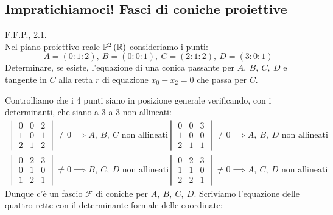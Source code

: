\subsection{Impratichiamoci! Fasci di coniche proiettive}
\begin{exercise} \textsc{F.F.P., 2.1.}\\
	Nel piano proiettivo reale $\proj[2]{\realset}$ consideriamo i punti:
	\begin{equation*}
		A=(0\colon 1 \colon 2),\ B=(0\colon 0\colon 1),\ C=(2\colon1\colon2),\ D=(3\colon0\colon1)
	\end{equation*}
	Determinare, se esiste, l'equazione di una conica passante per $A,\ B,\ C,\ D$ e tangente in $C$ alla retta $r$ di equazione $x_0-x_2=0$ che passa per $C$.
\end{exercise}
\begin{solution}
	Controlliamo che i 4 punti siano in posizione generale verificando,  con i determinanti, che siano a 3 a 3 non allineati:
		\begin{equation*}
			\begin{array}{ll}
				\begin{vmatrix}
					0 & 0 & 2\\
					1 & 0 & 1\\
					2 & 1 & 2
				\end{vmatrix} \neq 0 \implies A,\ B,\ C \text{ non allineati} &
				\quad\begin{vmatrix}
					0 & 0 & 3\\
					1 & 0 & 0\\
					2 & 1 & 1
				\end{vmatrix} \neq 0 \implies A,\ B,\ D \text{ non allineati} \\
			\begin{vmatrix}
				0 & 2 & 3\\
				0 & 1 & 0\\
				1 & 2 & 1
			\end{vmatrix} \neq 0 \implies B,\ C,\ D \text{ non allineati} &
			\quad \begin{vmatrix}
				0 & 2 & 3\\
				1 & 1 & 0\\
				2 & 2 & 1
			\end{vmatrix} \neq 0 \implies A,\ C,\ D \text{ non allineati}
			\end{array}
		\end{equation*}
	Dunque c'è un fascio $\mathcal{F}$ di coniche per $A,\ B,\ C,\ D$. Scriviamo l'equazione delle quattro rette con il determinante formale delle coordinate:

\end{solution}
